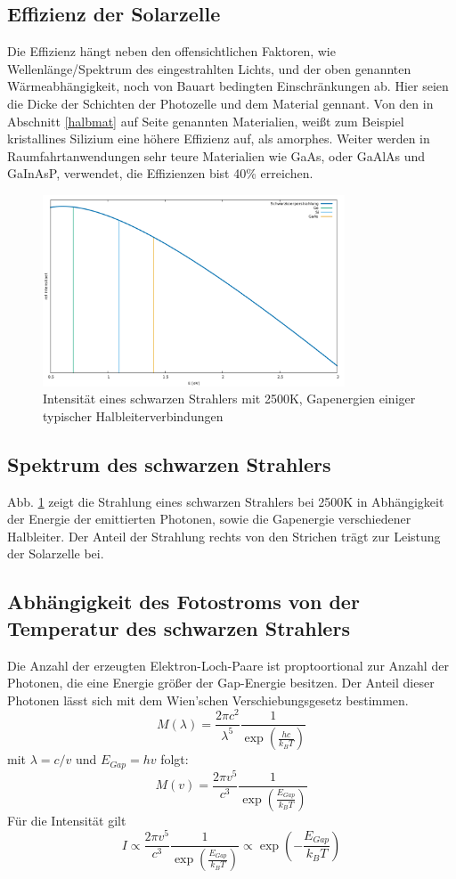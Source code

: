 \subsection*{Effizienz der Solarzelle}
Die Effizienz hängt neben den offensichtlichen Faktoren, wie Wellenlänge/Spektrum des eingestrahlten Lichts, und der oben genannten Wärmeabhängigkeit, noch von Bauart bedingten Einschränkungen ab. Hier seien die Dicke der Schichten der Photozelle und dem Material gennant. 
Von den in Abschnitt \ref{halbmat} auf Seite \pageref{halbmat} genannten Materialien, weißt zum Beispiel kristallines Silizium eine höhere Effizienz auf, als amorphes. Weiter werden in Raumfahrtanwendungen sehr teure Materialien wie GaAs, oder GaAlAs und GaInAsP, verwendet, die Effizienzen bist 40\% erreichen.

\begin{figure}[htb]
	\centering
	\includegraphics[width=0.8\textwidth]{Abb/aufg18.pdf}
	\caption{Intensität eines schwarzen Strahlers mit 2500K, Gapenergien einiger typischer Halbleiterverbindungen}
	\label{aufg18}
\end{figure}
\subsection*{Spektrum des schwarzen Strahlers}
Abb. \ref{aufg18} zeigt die Strahlung eines schwarzen Strahlers bei 2500K in Abhängigkeit der Energie der emittierten Photonen, sowie die Gapenergie verschiedener Halbleiter. Der Anteil der Strahlung rechts von den Strichen trägt zur Leistung der Solarzelle bei.

\subsection*{Abhängigkeit des Fotostroms von der Temperatur des schwarzen Strahlers}
Die Anzahl der erzeugten Elektron-Loch-Paare ist proptoortional zur Anzahl der Photonen, die eine Energie größer der Gap-Energie besitzen. Der Anteil dieser Photonen lässt sich mit dem Wien'schen Verschiebungsgesetz bestimmen. 
\[
M( \lambda ) = \frac{2 \pi c^2}{ \lambda^5 } \frac{ 1 }{ \exp \left( \frac{hc}{k_B T} \right) }
\]
mit $\lambda = c/v$ und $E_{Gap} = hv$ folgt:
\[
M(v) = \frac{2 \pi v^5}{c^3} \frac{1}{ \exp \left( \frac{E_{Gap}}{k_B T} \right)}
\]
Für die Intensität gilt
\[
I \propto \frac{2 \pi v^5}{c^3} \frac{1}{ \exp \left( \frac{E_{Gap}}{k_B T} \right)} \propto \exp \left( - \frac{E_{Gap}}{k_B T} \right)
\]
